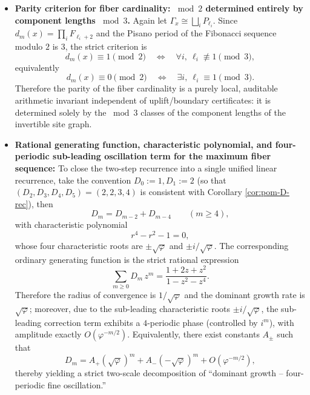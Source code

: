 \begin{enumerate}
\begin{itemize}
    \item \textbf{Parity criterion for fiber cardinality: \texorpdfstring{$\bmod 2$}{mod 2} determined entirely by component lengths \texorpdfstring{$\bmod 3$}{mod 3}.}
    Again let \(\Gamma_x\cong\bigsqcup_i P_{\ell_i}\). Since \(d_m(x)=\prod_i F_{\ell_i+2}\) and the Pisano period of the Fibonacci sequence modulo \(2\) is \(3\), the strict criterion is
    \[
    d_m(x)\equiv 1\pmod 2
    \quad\Longleftrightarrow\quad
    \forall i,\ \ell_i\not\equiv 1\pmod 3,
    \]
    equivalently
    \[
    d_m(x)\equiv 0\pmod 2
    \quad\Longleftrightarrow\quad
    \exists i,\ \ell_i\equiv 1\pmod 3.
    \]
    Therefore the parity of the fiber cardinality is a purely local, auditable arithmetic invariant independent of uplift/boundary certificates: it is determined solely by the \(\bmod 3\) classes of the component lengths of the invertible site graph.

    \item \textbf{Rational generating function, characteristic polynomial, and four-periodic sub-leading oscillation term for the maximum fiber sequence:}
    To close the two-step recurrence into a single unified linear recurrence, take the convention \(D_0:=1,D_1:=2\) (so that \((D_2,D_3,D_4,D_5)=(2,2,3,4)\) is consistent with Corollary \ref{cor:pom-D-rec}), then
    \[
    D_m=D_{m-2}+D_{m-4}\qquad(m\ge 4),
    \]
    with characteristic polynomial
    \[
    r^{4}-r^{2}-1=0,
    \]
    whose four characteristic roots are \(\pm\sqrt{\varphi}\) and \(\pm i/\sqrt{\varphi}\).
    The corresponding ordinary generating function is the strict rational expression
    \[
    \sum_{m\ge 0} D_m\,z^m=\frac{1+2z+z^{2}}{1-z^{2}-z^{4}}.
    \]
    Therefore the radius of convergence is \(1/\sqrt{\varphi}\) and the dominant growth rate is \(\sqrt{\varphi}\); moreover, due to the sub-leading characteristic roots \(\pm i/\sqrt{\varphi}\), the sub-leading correction term exhibits a \(4\)-periodic phase (controlled by \(i^m\)), with amplitude exactly \(O(\varphi^{-m/2})\). Equivalently, there exist constants \(A_\pm\) such that
    \[
    D_m=A_+(\sqrt{\varphi})^{m}+A_-(-\sqrt{\varphi})^{m}+O(\varphi^{-m/2}),
    \]
    thereby yielding a strict two-scale decomposition of ``dominant growth -- four-periodic fine oscillation.''


\end{itemize}
\end{enumerate}
